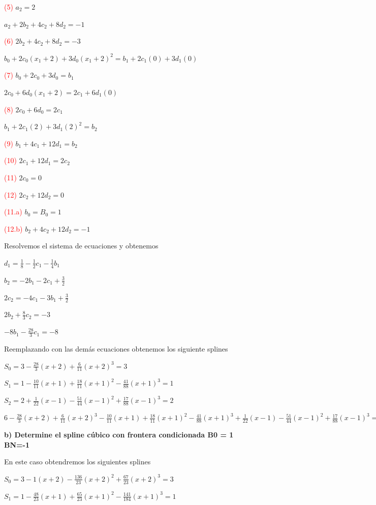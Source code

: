 \documentclass[12pt]{article}
\begin{document}
\textcolor{red}{(5)} $a_2 = 2$

$a_2+2b_2+4c_2+8d_2 = -1$

\textcolor{red}{(6)}  $2b_2+4c_2+8d_2 = -3$

$b_0 +2c_0(x_1+2)+3d_0(x_1+2)^2 = b_1+2c_1(0)+3d_1(0)$

\textcolor{red}{(7)}  $b_0+2c_0+3d_0=b_1$

$2c_0+6d_0(x_1+2) = 2c_1+6d_1(0)$

\textcolor{red}{(8)} $2c_0+6d_0=2c_1$

$b_1 +2c_1(2)+3d_1(2)^2 = b_2$

\textcolor{red}{(9)} $b_1+4c_1+12d_1=b_2$

\textcolor{red}{(10)} $2c_1+12d_1=2c_2$

\textcolor{red}{(11)} $2c_0=0$

\textcolor{red}{(12)} $2c_2+12d_2=0$

\textcolor{red}{(11.a)} $b_0=B_0=1$

\textcolor{red}{(12.b)} $b_2+4c_2+12d_2=-1$

Resolvemos el sistema de ecuaciones y obtenemos

$d_1 = \frac{1}{8} - \frac{1}{2}c_1- \frac{1}{4}b_1$


$b_2 = -2b_1 - 2c_1 + \frac{3}{2}$

$2c_2 = -4c_1 - 3b_1 + \frac{3}{2}$

$2b_2 + \frac{8}{3}c_2 = -3$

$-8b_1-\frac{28}{3}c_1=-8$

Reemplazando con las demás ecuaciones obtenemos los siguiente splines

$S_0 =  3-\frac{28}{3}(x+2)+\frac{6}{11}(x+2)^3 = 3$

$S_1 = 1-\frac{10}{11}(x+1)+\frac{18}{11}(x+1)^2-\frac{41}{88}(x+1)^3 = 1$

$S_2 = 2+\frac{1}{22}(x-1)-\frac{51}{44}(x-1)^2+\frac{17}{88}(x-1)^3 = 2$

\small
$6 -\frac{28}{3}(x+2)+\frac{6}{11}(x+2)^3 -\frac{10}{11}(x+1)+\frac{18}{11}(x+1)^2-\frac{41}{88}(x+1)^3+\frac{1}{22}(x-1)-\frac{51}{44}(x-1)^2+\frac{17}{88}(x-1)^3 = 6$
\normalsize

\textbf{b) Determine el spline cúbico con frontera condicionada B0 = 1 BN=-1}

En este caso obtendremos los siguientes splines

$S_0 =  3-1(x+2)-\frac{136}{23}(x+2)^2+\frac{67}{23}(x+2)^3 = 3$

$S_1 = 1-\frac{48}{23}(x+1)+\frac{65}{23}(x+1)^2-\frac{141}{184}(x+1)^3 = 1$
\end{document}
